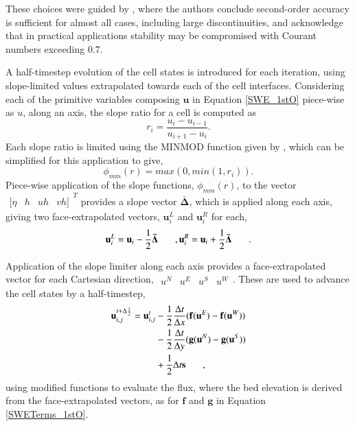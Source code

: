 These choices were guided by \citet{Erduran2002}, where the authors conclude second-order accuracy is sufficient for almost all cases, including large discontinuities, and acknowledge that in practical applications stability may be compromised with Courant numbers exceeding $0.7$.

A half-timestep evolution of the cell states is introduced for each iteration, using slope-limited values extrapolated towards each of the cell interfaces. Considering each of the primitive variables composing $\textbf{u}$ in Equation \ref{SWE_1stO} piece-wise as $u$, along an axis, the slope ratio for a cell is computed as 
\begin{equation}
	\label{SWE_SlopeRatio}
	r_i = \frac{u_i - u_{i-1}}{u_{i+1} - u_i}
	.
\end{equation}
Each slope ratio is limited using the MINMOD function given by \citet{Toro2001}, which can be simplified for this application to give,
\begin{equation}
	\label{SlopeLimiter_MINMOD}
	\phi_{mm}(r) = max(0, min( 1, r_i ))
	.
\end{equation}
Piece-wise application of the slope functions, $\phi_{mm}(r)$, to the vector \(\begin{matrix}[\eta & h & uh & vh]\end{matrix}^T\) provides a slope vector $\mathbf{\bar{\Delta}}$, which is applied along each axis, giving two face-extrapolated vectors, $\mathbf{u}_i^L$ and $\mathbf{u}_i^R$ for each,
\begin{equation}
	\label{MUSCL_FaceExtrapolation}
	\mathbf{u}_i^L = \textbf{u}_i - \frac{1}{2}\mathbf{\bar{\Delta}}\hspace{4ex}, \\
	\mathbf{u}_i^R = \textbf{u}_i + \frac{1}{2}\mathbf{\bar{\Delta}}\hspace{4ex}
	.
\end{equation}

Application of the slope limiter along each axis provides a face-extrapolated vector for each Cartesian direction, \(\begin{matrix}u^N & u^E & u^S & u^W\end{matrix}\). These are used to advance the cell states by a half-timestep,
\begin{equation}
	\label{SWE_MUSCL_HalfTimestep}
	\begin{alignedat}{2}
	\mathbf{u}_{i,j}^{t+\Delta\frac{1}{2}} 
	=
	\mathbf{u}_{i,j}^{t}
	& - \frac{1}{2} \frac{\Delta t}{\Delta x} (\mathbf{f}(\mathbf{u}^E) - \mathbf{f}(\mathbf{u}^W)) \\
	& - \frac{1}{2} \frac{\Delta t}{\Delta y} (\mathbf{g}(\mathbf{u}^N) - \mathbf{g}(\mathbf{u}^S)) \\
	& + \frac{1}{2} \Delta t \mathbf{s} 
	\hspace{4ex},
	\end{alignedat}
\end{equation}
using modified functions to evaluate the flux, where the bed elevation is derived from the face-extrapolated vectors, as for $\mathbf{f}$ and $\mathbf{g}$ in Equation \ref{SWETerms_1stO}.

